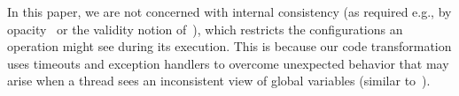 In this paper, we are not concerned with internal consistency (as required e.g., by opacity~\cite{GuerraouiK2008} or the validity notion of~\cite{LevAriCK2014}),
which restricts the configurations an operation might see during its execution.
This is because our code transformation uses timeouts and exception handlers to overcome unexpected behavior that may arise when a thread sees an inconsistent view of global variables (similar to~\cite{Nakaike:2010}).




